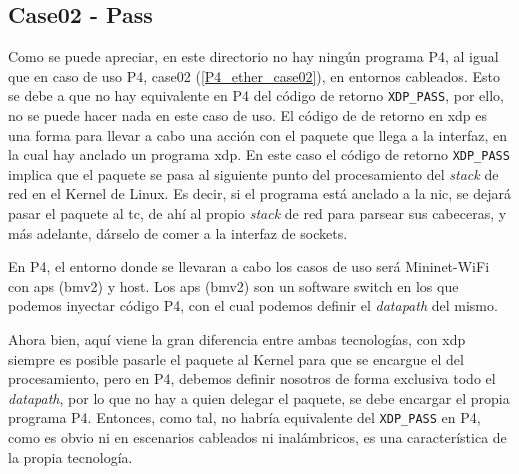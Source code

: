 \subsection{Case02 - Pass}
\label{p4_wifi_case02}


Como se puede apreciar, en este directorio no hay ningún programa P4, al igual que en caso de uso P4, case02 (\ref{P4_ether_case02}),  en entornos cableados. Esto se debe a que no hay equivalente en P4 del código de retorno \texttt{XDP\_PASS}, por ello, no se puede hacer nada en este caso de uso. El código de de retorno en \gls{xdp} es una forma para llevar a cabo una acción con el paquete que llega a la interfaz, en la cual hay anclado un programa \gls{xdp}. En este caso el código de retorno  \texttt{XDP\_PASS} implica que el paquete se pasa al siguiente punto del procesamiento del \textit{stack} de red en el Kernel de Linux. Es decir, si el programa está anclado a la \gls{nic}, se dejará pasar el paquete al \gls{tc}, de ahí al propio \textit{stack} de red para parsear sus cabeceras, y más adelante, dárselo de comer a la interfaz de sockets.\\
\par

En P4, el entorno donde se llevaran a cabo los casos de uso será Mininet-WiFi con \gls{ap}s (\gls{bmv2}) y host. Los \gls{ap}s (\gls{bmv2}) son un software switch en los que podemos inyectar código P4, con el cual podemos definir el \textit{datapath} del mismo.\\
\par

Ahora bien, aquí viene la gran diferencia entre ambas tecnologías, con \gls{xdp} siempre es posible pasarle el paquete al Kernel para que se encargue el del procesamiento, pero en P4, debemos definir nosotros de forma exclusiva todo el \textit{datapath}, por lo que no hay a quien delegar el paquete, se debe encargar el propia programa P4. Entonces, como tal, no habría equivalente del  \texttt{XDP\_PASS} en P4, como es obvio ni en escenarios cableados ni inalámbricos, es una característica de la propia tecnología.\\
\par